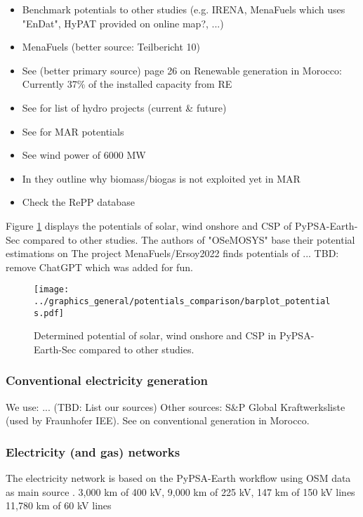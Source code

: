 \begin{itemize}
    \item Benchmark potentials to other studies (e.g. IRENA, MenaFuels which uses "EnDat", HyPAT provided on online map?, ...)
    \item MenaFuels \cite[p. 25]{Ersoy2022} (better source: Teilbericht 10)
    \item See \cite{Ersoy2022} (better primary source) page 26 on Renewable generation in Morocco: Currently 37\% of the installed capacity from RE
    \item See \cite[p. 5]{Boulakhbar2020} for list of hydro projects (current \& future)
    \item See \cite[primary 10,13,17]{Boulakhbar2020} for MAR potentials
    \item See \cite[primary 13, 38]{Boulakhbar2020} wind power of 6000 MW
    \item In \cite[p. 6]{Boulakhbar2020} they outline why biomass/biogas is not exploited yet in MAR
    \item Check the RePP database \cite{Peters2023}
\end{itemize}

Figure \ref{fig:potentials} displays the potentials of solar, wind onshore and CSP 
of PyPSA-Earth-Sec compared to other studies. The authors of "OSeMOSYS" 
\cite{Cannone2021} base their potential estimations on \cite[primary: 13,18,19]{Cannone2021}
The project MenaFuels/Ersoy2022 \cite{Ersoy2022} finds potentials of ...
TBD: remove ChatGPT which was added for fun.

\begin{figure}[h!]
    \centering
    \texttt{[image: ../graphics\_general/potentials\_comparison/barplot\_potentials.pdf]}
    \caption{Determined potential of solar, wind onshore and CSP in PyPSA-Earth-Sec compared to other studies.}
    \label{fig:potentials}
\end{figure}


\subsubsection{Conventional electricity generation}
We use: ... (TBD: List our sources)
Other sources: S\&P Global Kraftwerksliste (used by Fraunhofer IEE).
See \cite[p. 26]{Ersoy2022}  on conventional generation in Morocco.


\subsubsection{Electricity (and gas) networks}
The electricity network is based on the PyPSA-Earth workflow using OSM data as main source \cite{Parzen2022}.
3,000 km of 400 kV, 9,000 km of 225 kV, 147 km of 150 kV lines 
11,780 km of 60 kV lines \cite[p. 6, primary 44]{Boulakhbar2020}


